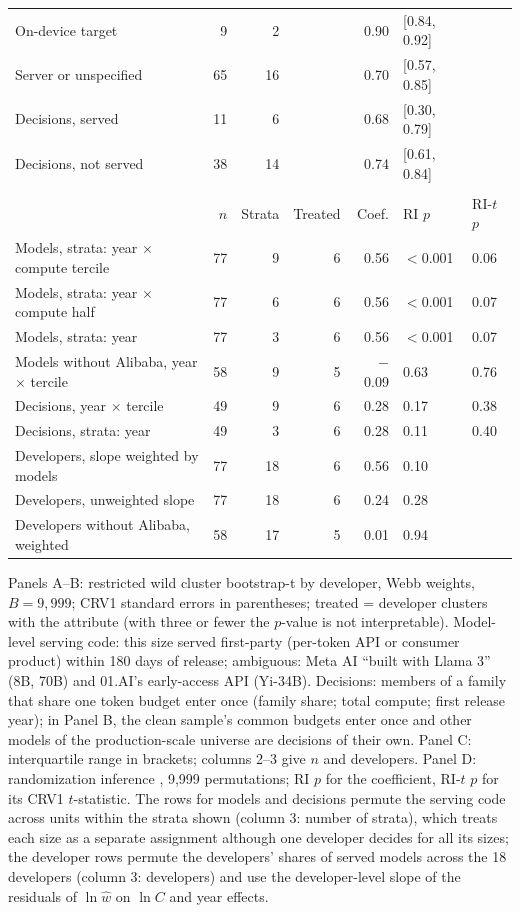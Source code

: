 \begin{table}[tp]
\begin{tabular}{@{}lrrrrll@{}}
On-device target & 9 & 2 & & 0.90 & {\scriptsize[0.84, 0.92]} & \\
Server or unspecified & 65 & 16 & & 0.70 & {\scriptsize[0.57, 0.85]} & \\
Decisions, served & 11 & 6 & & 0.68 & {\scriptsize[0.30, 0.79]} & \\
Decisions, not served & 38 & 14 & & 0.74 & {\scriptsize[0.61, 0.84]} & \\
\addlinespace
\multicolumn{7}{@{}l}{\textit{Panel D. Randomization inference for the serving coefficient of Panel A (two-sided)}} \\[1pt]
& $n$ & Strata & Treated & Coef. & RI $p$ & RI-$t$ $p$ \\
Models, strata: year $\times$ compute tercile & 77 & 9 & 6 & 0.56 & $<$0.001 & 0.06 \\
Models, strata: year $\times$ compute half & 77 & 6 & 6 & 0.56 & $<$0.001 & 0.07 \\
Models, strata: year & 77 & 3 & 6 & 0.56 & $<$0.001 & 0.07 \\
Models without Alibaba, year $\times$ tercile & 58 & 9 & 5 & $-$0.09 & 0.63 & 0.76 \\
Decisions, year $\times$ tercile & 49 & 9 & 6 & 0.28 & 0.17 & 0.38 \\
Decisions, strata: year & 49 & 3 & 6 & 0.28 & 0.11 & 0.40 \\
Developers, slope weighted by models & 77 & 18 & 6 & 0.56 & 0.10 & \\
Developers, unweighted slope & 77 & 18 & 6 & 0.24 & 0.28 & \\
Developers without Alibaba, weighted & 58 & 17 & 5 & 0.01 & 0.94 & \\
\bottomrule
\end{tabular}
\medskip
\begin{tablenotes}
Panels A--B: restricted wild cluster bootstrap-t by developer, Webb weights, $B=9{,}999$; CRV1 standard errors in parentheses; treated = developer clusters with the attribute (with three or fewer the $p$-value is not interpretable). Model-level serving code: this size served first-party (per-token API or consumer product) within 180 days of release; ambiguous: Meta AI ``built with Llama 3'' (8B, 70B) and 01.AI's early-access API (Yi-34B). Decisions: members of a family that share one token budget enter once (family share; total compute; first release year); in Panel B, the clean sample's common budgets enter once and other models of the production-scale universe are decisions of their own. Panel C: interquartile range in brackets; columns 2--3 give $n$ and developers. Panel D: randomization inference \citep{mackinnon2020randomization}, 9,999 permutations; RI $p$ for the coefficient, RI-$t$ $p$ for its CRV1 $t$-statistic. The rows for models and decisions permute the serving code across units within the strata shown (column 3: number of strata), which treats each size as a separate assignment although one developer decides for all its sizes; the developer rows permute the developers' shares of served models across the 18 developers (column 3: developers) and use the developer-level slope of the residuals of $\ln\hat w$ on $\ln C$ and year effects.
\end{tablenotes}
\end{table}

